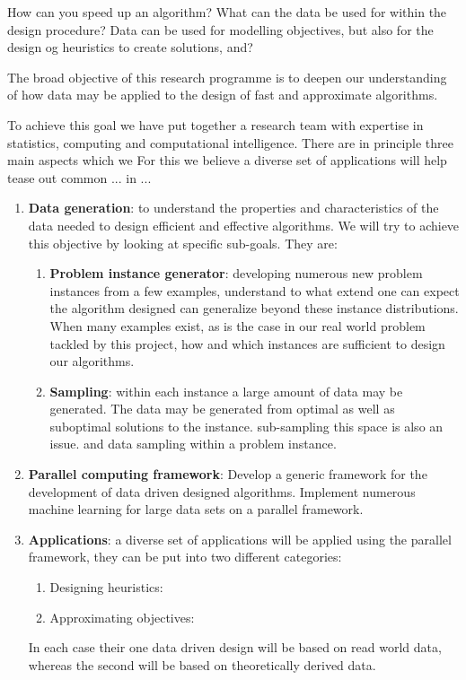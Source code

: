 \documentclass[12pt,a4paper]{article}
\begin{document}
How can you speed up an algorithm? What can the data be used for within the design procedure? Data can be used for 
modelling objectives, but also for the design og heuristics to create solutions, and?


The broad objective of this research programme is to deepen our
understanding of how data may be applied to the design of fast and
approximate algorithms. 



To achieve this goal we have put together a research 
team with expertise in statistics, computing and computational intelligence. 
There are in principle three main aspects which we For this we believe a diverse set of applications 
will help tease out common ... in ...


\begin{enumerate}
\item {\bf Data generation}: to understand the properties and characteristics of the data needed to design efficient 
and effective algorithms. We will try to achieve this objective by looking at specific sub-goals. They are:
\begin{enumerate}
\item {\bf Problem instance generator}: developing numerous new problem instances from a few examples, understand to 
what extend one can expect the algorithm designed can generalize beyond these instance distributions. When many 
examples exist, as is the case in our real world problem tackled by this project, how and which instances are 
sufficient to design our algorithms.
\item {\bf Sampling}: within each instance a large amount of data may be generated. The data may be generated from 
optimal as well as 
suboptimal solutions to the instance. sub-sampling this space is also an issue. and data sampling within a problem 
instance.
\end{enumerate}
\item {\bf Parallel computing framework}: Develop a generic framework for the development of data driven designed 
algorithms. Implement numerous machine learning for large data sets on a parallel framework. 
\item {\bf Applications}: a diverse set of applications will be applied using the parallel framework, they can be put 
into two different categories:
\begin{enumerate}
\item {Designing heuristics}:
\item {Approximating objectives}:
\end{enumerate}
In each case their one data driven design will be based on read world data, whereas the second will be based on 
theoretically derived data.
\end{enumerate}
\end{document}
